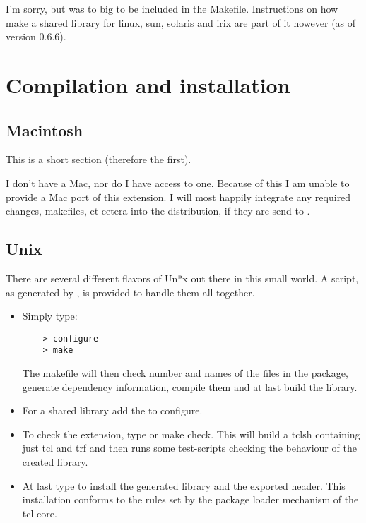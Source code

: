 \documentclass {report}
\begin{document}
I'm sorry, but \SSLeay{} was to big to be included in the
Makefile. Instructions on how make a shared library for linux, sun,
solaris and irix are part of it however (as of version 0.6.6).



\chapter {Compilation and installation}
\section {Macintosh}

	This is a short section (therefore the first).

	I don't have a Mac, nor do I have access to one. Because
	of this I am unable to provide a Mac port of this
	extension.  I will most happily integrate any required
	changes, makefiles, et cetera into the distribution,
	if they are send to \me{}.


\section {Unix}

There are several different flavors of Un*x out there in this small
world. A  script, as generated by , is provided to handle them all together.

\begin {itemize}
\item	Simply type:

\begin{verbatim}
	> configure
	> make
\end{verbatim}

The makefile will then check number and names of the files in the
package, generate dependency information, compile them and at last
build the library.

\item	For a shared library add the  to \cmd
	{configure}. 

\item	To check the extension, type  or \cmd
	{make check}. This will build a tclsh containing just tcl and
	trf and then runs some test-scripts checking the behaviour of
	the created library. 

\item	At last type  to install the generated
	library and the exported header. This installation conforms to
	the rules set by the package loader mechanism of the tcl-core. 
\end {itemize}
\end{document}
